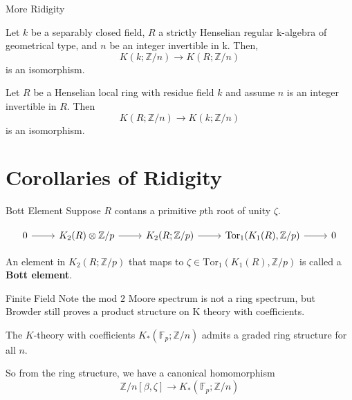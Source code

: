 \documentclass{beamer}
\begin{document}
\begin{frame}{More Ridigity}
\begin{theorem}
Let $k$ be a separably closed field, $R$ a strictly Henselian regular k-algebra of geometrical type, and $n$ be an integer invertible in k. Then,
\[K(k; \mathbb{Z}/n)\to K(R; \mathbb{Z}/n)\]
is an isomorphism.

\end{theorem}



\begin{theorem}[Gabber, 92]
  Let $R$ be a Henselian local ring with residue field $k$ and assume $n$ is an integer invertible in $R$. Then
\[K(R; \mathbb{Z}/n)\to K(k; \mathbb{Z}/n)\]
is an isomorphism.
\end{theorem}
\end{frame}















\section{Corollaries of Ridigity}

\begin{frame}[fragile]{Bott Element}
Suppose $R$ contans a primitive $p$th root of unity $\zeta$.

\[\begin{tikzcd}
	0 & {K_2(R)\otimes\mathbb{Z}/p} & {K_2(R;\mathbb{Z}/p)} & {\textrm{Tor}_1(K_1(R), \mathbb{Z}/p)} & 0
	\arrow[from=1-1, to=1-2]
	\arrow[from=1-2, to=1-3]
	\arrow[from=1-3, to=1-4]
	\arrow[from=1-4, to=1-5]
\end{tikzcd}\]

\begin{definition}
  An element in $K_2(R; \mathbb{Z}/p)$ that maps to $\zeta\in \textrm{Tor}_1(K_1(R), \mathbb{Z}/p)$ is called a \textbf{Bott element}.
\end{definition}


\end{frame}



\begin{frame}{Finite Field}
 Note the mod $2$ Moore spectrum is not a ring spectrum, but Browder still proves a product structure on K theory with coefficients. 
\begin{theorem}[Browder, 78]
The $K$-theory with coefficients $K_*(\mathbb{F}_p; \mathbb{Z}/n)$ admits a graded ring structure for all $n$.
\end{theorem}\pause
So from the ring structure, we have a canonical homomorphism 
\[\mathbb{Z}/n[\beta,\zeta]\to K_*(\mathbb{F}_p; \mathbb{Z}/n)\]


\end{frame}
\end{document}
